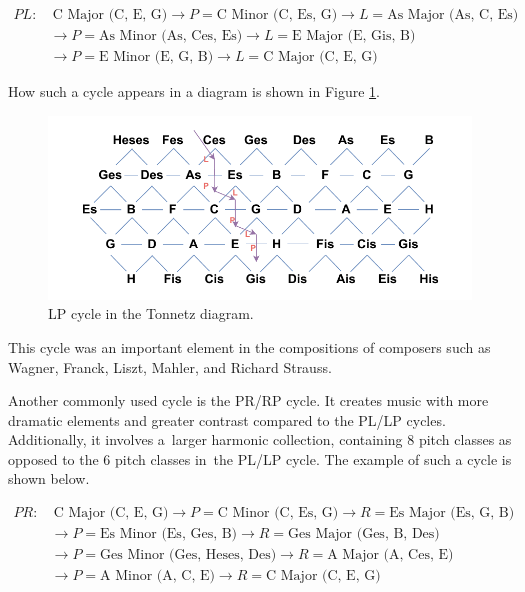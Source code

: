 \[
\begin{aligned}
PL: & \ \text{C Major (C, E, G)} \rightarrow P = \text{C Minor (C, Es, G)} \rightarrow L = \text{As Major (As, C, Es)} \\
    & \rightarrow P = \text{As Minor (As, Ces, Es)} \rightarrow L = \text{E Major (E, Gis, B)} \\
    & \rightarrow P = \text{E Minor (E, G, B)} \rightarrow L = \text{C Major (C, E, G)}
\end{aligned}
\]

How such a cycle appears in a diagram is shown in Figure \ref{fig:tonnetzLP}.

\begin{figure}[H]
    \centering
    \includegraphics[scale=0.8]{obrazky-figures/tonnetzLP.pdf}
    \caption{LP cycle in the Tonnetz diagram.}
    \label{fig:tonnetzLP}
\end{figure}

This cycle was an important element in the compositions of composers such as Wagner, Franck, Liszt, Mahler, and Richard Strauss.

Another commonly used cycle is the PR/RP cycle. It creates music with more dramatic elements and greater contrast compared to the PL/LP cycles. Additionally, it involves a~larger harmonic collection, containing 8 pitch classes as opposed to the 6 pitch classes in~the PL/LP cycle. The example of such a cycle is shown below.

\[
\begin{aligned}
PR: & \ \text{C Major (C, E, G)} \rightarrow P = \text{C Minor (C, Es, G)} \rightarrow R = \text{Es Major (Es, G, B)} \\
    & \rightarrow P = \text{Es Minor (Es, Ges, B)} \rightarrow R = \text{Ges Major (Ges, B, Des)} \\
    & \rightarrow P = \text{Ges Minor (Ges, Heses, Des)} \rightarrow R = \text{A Major (A, Ces, E)} \\
    & \rightarrow P = \text{A Minor (A, C, E)} \rightarrow R = \text{C Major (C, E, G)}
\end{aligned}
\]

